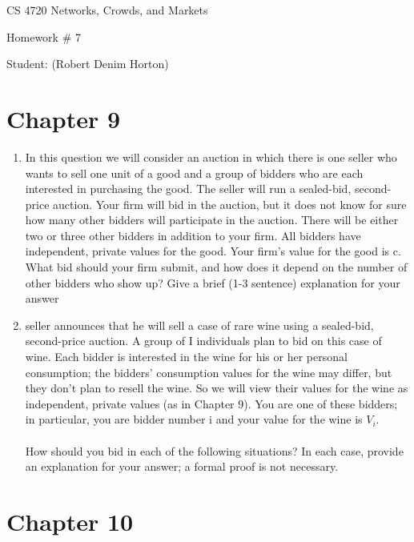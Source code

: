 \documentclass[11pt]{article}
\begin{document}
 

\rhead{\today}

\begin{center}\begin{Large}
CS 4720 Networks, Crowds, and Markets

Homework \#  7

Student: (Robert Denim Horton)
\end{Large}
\end{center}

\section*{Chapter 9}
\begin{enumerate}

	 \item In this question we will consider an auction in which there is one seller who wants to sell one unit of a good and a group of bidders who are each interested in purchasing the good. The seller will run a sealed-bid, second-price auction. Your firm will bid in the auction, but it does not know for sure how many other bidders will participate in the auction. There will be either two or three other bidders in addition to your firm. All bidders have independent, private values for the good. Your firm’s value for the good is c. What bid should your firm submit, and how does it depend on the number of other bidders who show up? Give a brief (1-3 sentence) explanation for your answer 

	\item  seller announces that he will sell a case of rare wine using a sealed-bid, second-price auction. A group of I individuals plan to bid on this case of wine. Each bidder is interested in the wine for his or her personal consumption; the bidders’ consumption values for the wine may differ, but they don’t plan to resell the wine. So we will view their values for the wine as independent, private values (as in Chapter 9). You are one of these bidders; in particular, you are bidder number i and your value for the wine is $V_i$.\\\\
How should you bid in each of the following situations? In each case, provide an explanation for your answer; a formal proof is not necessary.

\end{enumerate}

\section*{Chapter 10}
\end{document}
